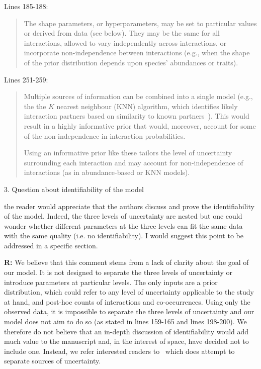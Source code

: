 \documentclass[12pt]{letter}
\newenvironment{refquote}{\bigskip \begin{it}}{\end{it}\smallskip}
\begin{document}
		Lines 185-188:


		\begin{quotation}
		    The shape parameters, or hyperparameters, may be set to particular values or derived from data (see below). They may be the same for all interactions, allowed to vary independently across interactions, or incorporate non-independence between interactions (e.g., when the shape of the prior distribution depends upon species' abundances or traits).
		\end{quotation}


		Lines 251-259:


		\begin{quotation}
			Multiple sources of information can be combined into a single model (e.g., the the $K$ nearest neighbour (KNN) algorithm, which identifies likely interaction partners based on similarity to known partners~\citep{DesjardinsProulx2017}). This would result in a highly informative prior that would, moreover, account for some of the non-independence in interaction probabilities. 


	        Using an informative prior like these tailors the level of uncertainty surrounding each interaction and may account for non-independence of interactions (as in abundance-based or KNN models).
	    \end{quotation}


	3. Question about identifiability of the model


		\begin{refquote}

			the reader would appreciate that the authors discuss and prove the identifiability of the model. Indeed, the three levels of uncertainty are nested but one could wonder whether different parameters at the three levels can fit the same data with the same quality (i.e. no identifiability).  I would suggest this point to be addressed in a specific section.

		\end{refquote}


		\textbf{R:} We believe that this comment stems from a lack of clarity about the goal of our model. It is not designed to separate the three levels of uncertainty or introduce parameters at particular levels. The only inputs are a prior distribution, which could refer to any level of uncertainty applicable to the study at hand, and post-hoc counts of interactions and co-occurrences. Using only the observed data, it is impossible to separate the three levels of uncertainty and our model does not aim to do so (as stated in lines 159-165 and lines 198-200). We therefore do not believe that an in-depth discussion of identifiability would add much value to the manuscript and, in the interest of space, have decided not to include one. Instead, we refer interested readers to~\citet{Weinstein2017} which does attempt to separate sources of uncertainty.
\end{document}
